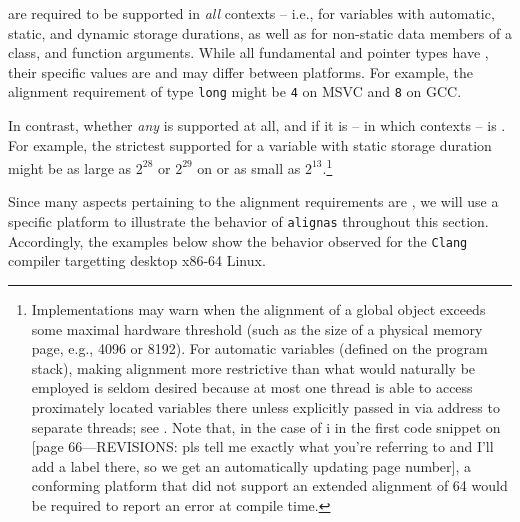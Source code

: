  are required to be supported in \emph{all} contexts -- i.e., for variables with automatic, static, and dynamic storage durations, as well as for non-static data members of a class, and function arguments.  While all fundamental and pointer types have , their specific values are  and may differ between platforms.  For example, the alignment requirement of type \lstinline!long! might be \lstinline!4! on MSVC and \lstinline!8! on GCC.

In contrast, whether \emph{any}  is supported at all, and if it is -- in which contexts -- is . For example, the strictest supported  for a variable with static storage duration might be as large as $2^{28}$ or $2^{29}$ on or as small as $2^{13}$.\footnote{Implementations may warn when the alignment of a global object exceeds some maximal hardware threshold (such as the size of a physical memory page, e.g., 4096 or 8192).  For automatic variables (defined on the program stack), making alignment more restrictive than what would naturally be employed is seldom desired because at most one thread is able to access proximately located variables there unless explicitly passed in via address to separate threads; see . Note that, in the case of i in the first code snippet on \pageref{}
[page 66---REVISIONS: pls tell me exactly what you're referring to and I'll add a label there, so we get an automatically updating page number], a conforming platform that did not support an extended alignment of 64 would be required to report an error at compile time.}

Since many aspects pertaining to the alignment requirements are , we will use a specific platform to illustrate the behavior of \lstinline!alignas! throughout this section.  Accordingly, the examples below show the behavior observed for the \lstinline!Clang! compiler targetting desktop x86-64 Linux.


